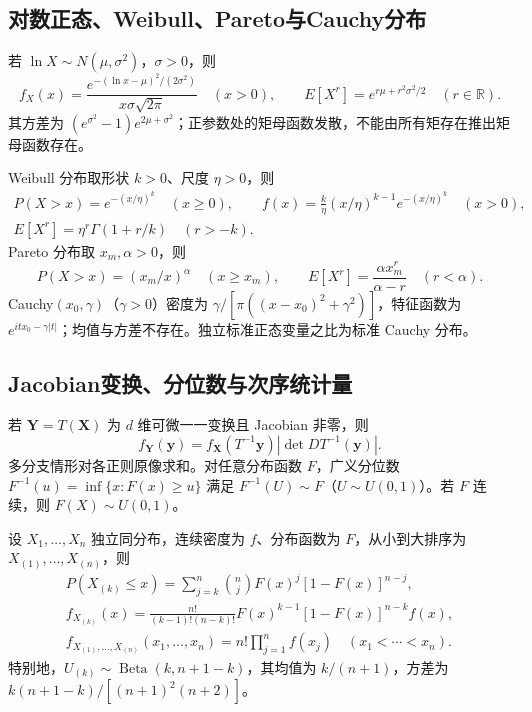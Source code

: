 \documentclass[../main.tex]{subfiles}
\begin{document}
\subsection{对数正态、Weibull、Pareto与Cauchy分布}
若 $\ln X\sim N(\mu,\sigma^2)$，$\sigma>0$，则
\[
f_X(x)=\frac{e^{-(\ln x-\mu)^2/(2\sigma^2)}}{x\sigma\sqrt{2\pi}}\quad(x>0),\qquad
E[X^r]=e^{r\mu+r^2\sigma^2/2}\quad(r\in\mathbb R).
\]
其方差为 $(e^{\sigma^2}-1)e^{2\mu+\sigma^2}$；正参数处的矩母函数发散，不能由所有矩存在推出矩母函数存在。

Weibull 分布取形状 $k>0$、尺度 $\eta>0$，则
\begin{gather*}
P(X>x)=e^{-(x/\eta)^k}\quad(x\ge0),\qquad
f(x)=\frac k\eta(x/\eta)^{k-1}e^{-(x/\eta)^k}\quad(x>0),\\
E[X^r]=\eta^r\Gamma(1+r/k)\quad(r>-k).
\end{gather*}
Pareto 分布取 $x_m,\alpha>0$，则
\[
P(X>x)=(x_m/x)^\alpha\quad(x\ge x_m),\qquad
E[X^r]=\frac{\alpha x_m^r}{\alpha-r}\quad(r<\alpha).
\]
Cauchy$(x_0,\gamma)$（$\gamma>0$）密度为 $\gamma/[\pi((x-x_0)^2+\gamma^2)]$，特征函数为 $e^{itx_0-\gamma|t|}$；均值与方差不存在。独立标准正态变量之比为标准 Cauchy 分布。

\subsection{Jacobian变换、分位数与次序统计量}
若 $\bm Y=T(\bm X)$ 为 $d$ 维可微一一变换且 Jacobian 非零，则
\[
f_{\bm Y}(\bm y)=f_{\bm X}(T^{-1}\bm y)\left|\det DT^{-1}(\bm y)\right|.
\]
多分支情形对各正则原像求和。对任意分布函数 $F$，广义分位数 $F^{-1}(u)=\inf\{x:F(x)\ge u\}$ 满足 $F^{-1}(U)\sim F$（$U\sim U(0,1)$）。若 $F$ 连续，则 $F(X)\sim U(0,1)$。

设 $X_1,\ldots,X_n$ 独立同分布，连续密度为 $f$、分布函数为 $F$，从小到大排序为 $X_{(1)},\ldots,X_{(n)}$，则
\begin{gather*}
P(X_{(k)}\le x)=\sum_{j=k}^n\binom nj F(x)^j[1-F(x)]^{n-j},\\
f_{X_{(k)}}(x)=\frac{n!}{(k-1)!(n-k)!}F(x)^{k-1}[1-F(x)]^{n-k}f(x),\\
f_{X_{(1)},\ldots,X_{(n)}}(x_1,\ldots,x_n)=n!\prod_{j=1}^nf(x_j)
\quad(x_1<\cdots<x_n).
\end{gather*}
特别地，$U_{(k)}\sim\operatorname{Beta}(k,n+1-k)$，其均值为 $k/(n+1)$，方差为 $k(n+1-k)/[(n+1)^2(n+2)]$。
\end{document}
